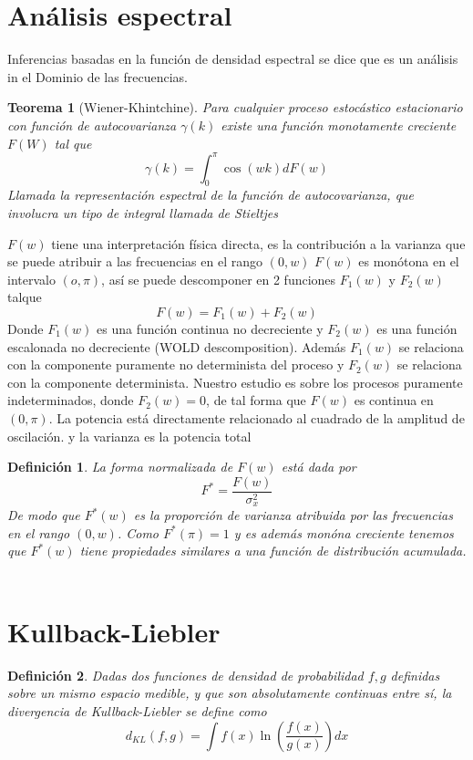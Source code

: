 \documentclass[12pt,oneside]{book}
\newtheorem*{defn}{Definici\'on}
\newtheorem{teorema}{Teorema}
\begin{document}
\section{An\'alisis espectral} %
\label{sec:analisis_espectral}
Inferencias basadas en la funci\'on de densidad espectral se dice que es un an\'alisis in el Dominio de las frecuencias.
\begin{teorema}[Wiener-Khintchine]\normalfont
Para cualquier proceso estoc\'astico estacionario con funci\'on de autocovarianza $\gamma(k)$ existe una funci\'on monotamente creciente $F(W)$ tal que 
$$
\gamma(k) = \int^\pi_0 \cos(wk)dF(w)
$$
Llamada la representaci\'on espectral de la funci\'on de autocovarianza, que involucra un tipo de integral llamada de Stieltjes
\end{teorema}
$F(w)$ tiene una interpretaci\'on f\'isica directa, es la contribuci\'on a la varianza que se puede atribuir a las frecuencias en el rango $(0,w)$
$F(w)$ es mon\'otona en el intervalo $(o,\pi)$, as\'i se puede descomponer en 2 funciones $F_1(w)$ y $F_2(w)$ talque 
$$
F(w) = F_1(w) + F_2(w) 
$$ 
Donde $F_1(w)$ es una funci\'on continua no decreciente y $F_2(w)$ es una funci\'on escalonada no decreciente
(WOLD descomposition). Adem\'as $F_1(w)$ se relaciona con la componente puramente no determinista del proceso y $F_2(w)$ se relaciona con la componente determinista. Nuestro estudio es sobre los procesos puramente indeterminados, donde $F_2(w) = 0$, de tal forma que $F(w)$ es continua en $(0, \pi)$.
La potencia est\'a directamente relacionado al cuadrado de la amplitud de oscilaci\'on. y la varianza es la potencia total
\begin{defn}\normalfont
La forma normalizada de $F(w)$ est\'a dada por
$$
F^* = \frac{F(w)}{\sigma_x^2}
$$
De modo que $F^*(w)$ es la proporci\'on de varianza atribuida por las frecuencias en el rango $(0,w)$. Como $F^*(\pi) = 1$ y es adem\'as mon\'ona creciente tenemos que $F^*(w)$ tiene propiedades similares a una funci\'on de distribuci\'on acumulada. ~\cite{TIME_SERIES_2}
\end{defn}
\section{Kullback-Liebler} %
\label{sec:kullback_liebler}
\begin{defn}\normalfont
	Dadas dos funciones de densidad de probabilidad $f, g$ definidas sobre un mismo espacio medible, y que son absolutamente continuas entre s\'i, la divergencia de Kullback-Liebler se define como
	$$
		d_{KL}(f, g) = \int f(x) \ln{\left(\frac{f(x)}{g(x)}\right)}dx
	$$
\end{defn}
\end{document}
